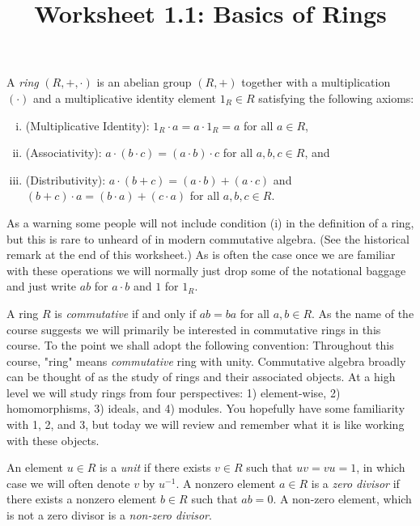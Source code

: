 \documentclass[12pt,reqno]{amsart}
\title{Worksheet 1.1: Basics of Rings}
\begin{document}

\maketitle
\thispagestyle{firstpageIP}

A \emph{ring} $(R,+,\cdot)$ is an abelian group $(R,+)$ together with a multiplication $(\cdot)$ and a multiplicative identity element $1_{R} \in R$ satisfying the following axioms:
\begin{enumerate}[(i)]
	\item (Multiplicative Identity): $1_{R} \cdot a = a \cdot 1_{R} = a$ for all $a\in R$,
	\item (Associativity): $a\cdot (b\cdot c) = (a\cdot b) \cdot c$ for all $a,b,c\in R$, and
	\item (Distributivity): $a\cdot(b+c) = (a\cdot b) + (a\cdot c)$ and $(b+c) \cdot a = (b\cdot a) + (c\cdot a)$ for all $a,b,c \in R$.
\end{enumerate}
As a warning some people will not include condition (i) in the definition of a ring, but this is rare to unheard of in modern commutative algebra. (See the historical remark at the end of this worksheet.) As is often the case once we are familiar with these operations we will normally just drop some of the notational baggage and just write $ab$ for $a\cdot b$ and $1$ for $1_{R}$. 

A ring $R$ is \emph{commutative} if and only if $ab = ba$ for all $a,b \in R$. As the name of the course suggests we will primarily be interested in commutative rings in this course. To the point we shall adopt the following convention: Throughout this course, "ring" means  \textit{commutative} ring with unity. Commutative algebra broadly can be thought of as the study of rings and their associated objects. At a high level we will study rings from four perspectives: 1) element-wise, 2) homomorphisms, 3) ideals, and 4) modules. You hopefully have some familiarity with 1, 2, and 3, but today we will review and remember what it is like working with these objects. 

An element $u \in R$ is a \emph{unit} if there exists $v \in R$ such that $uv = vu = 1$, in which case we will often denote $v$ by $u^{-1}$. A nonzero element $a \in R$ is a \emph{zero divisor} if there exists a nonzero element $b\in R$ such that $ab=0$. A non-zero element, which is not a zero divisor is a \emph{non-zero divisor}. 
 \hrulefill 
	
\end{document}
